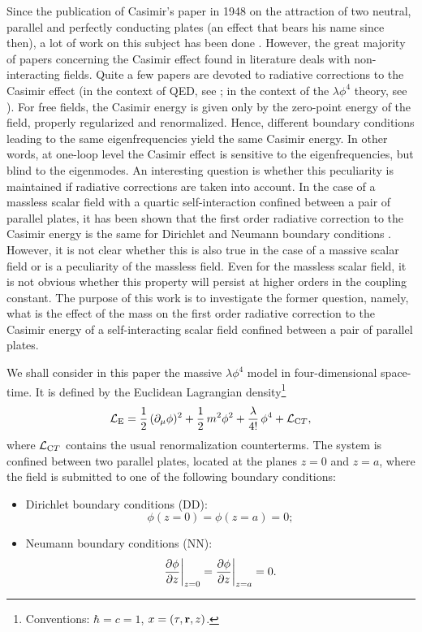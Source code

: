 \documentclass[a4paper,dvips,12pt]{article}
\begin{document}
Since the publication of Casimir's paper in 1948 
\cite{Casimir} on the 
attraction of two neutral, parallel and  perfectly conducting 
plates (an effect that bears his name since then), a lot of work 
on this subject has been done \cite{Mostepanenko}.
However, the great majority of papers 
concerning the Casimir effect found in literature deals with 
non-interacting fields. Quite a few papers are 
devoted to radiative corrections to the Casimir effect
(in the context of QED, see \cite{Mostepanenko,QED};
in the context of the $\lambda\phi^4$ theory, see
\cite{KrechDietrichPRA92,phi4}). For 
free fields, the Casimir energy is given only by the zero-point 
energy of the field, properly regularized and renormalized. 
Hence, different boundary conditions leading to the 
same eigenfrequencies yield the same Casimir energy. In other 
words, at one-loop level the Casimir effect is sensitive to
the eigenfrequencies, but blind to the eigenmodes. An interesting
question is whether this peculiarity 
is maintained if radiative corrections are 
taken into account. In the case of a massless scalar field with 
a quartic self-interaction confined between a pair of parallel plates, 
it has been shown that the first order radiative correction to
the Casimir energy is the same for Dirichlet and Neumann boundary conditions
\cite{KrechDietrichPRA92}. 
However, it is not clear whether this is also true in the case
of a massive scalar field or is a peculiarity of the massless field.
Even for the massless scalar field, it is not obvious whether this property will persist 
at higher orders in the coupling constant.
The purpose of this work is to investigate the former question, namely,
what is the effect of the mass on the first order radiative correction to the Casimir
energy of a self-interacting scalar field
confined between a pair of parallel plates.

We shall consider in this paper the massive $\lambda\phi^4$
model in four-dimensional space-time.
It is defined by the Euclidean Lagrangian 
density\footnote{Conventions: $\hbar=c=1$, $x=(\tau,{\bf r},z)$.}
\begin {equation}
{\cal L}_{\textrm E}={1\over 2}\,(\partial_{\mu}\phi)^{2}+{1\over 2}\,m^{2}\phi^{2}
+{\lambda\over 4!}\,\phi^{4}+{\cal L}_{\textrm CT},
\end {equation}
where ${\cal L}_{\textrm CT}$ contains the usual renormalization counterterms.
The system is confined between two parallel plates, located at
the planes $z=0$ and $z=a$, where the field is submitted to one
of the following boundary conditions:
%
\begin{itemize}
\item Dirichlet boundary conditions (DD):
\begin {equation}
\phi(z=0)=\phi(z=a)=0;
\end {equation}
\item Neumann boundary conditions (NN):
\begin {equation}
{\partial\phi\over\partial z}{\bigg |}_{z=0}
={\partial\phi\over\partial z}{\bigg |}_{z=a}=0.
\end {equation}
\end{itemize}
\end{document}
